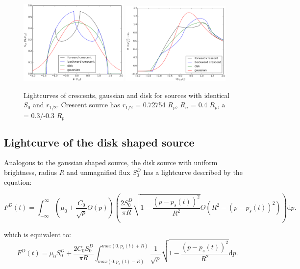 \begin{figure}
\centering
	\includegraphics[width = 0.48\textwidth]{plots/4source_profile.eps}
	\includegraphics[width = 0.48\textwidth]{plots/4source_magnification.eps}
\caption{\label{fig:lightcurve_gauss} Lightcurves of crescents, gaussian and disk for sources with identical $S_0$ and $r_{1/2}$. Crescent source has $r_{1/2}$ = 0.72754 $R_p$, $R_n$ = 0.4 $R_p$, a = 0.3/-0.3 $R_p$ }
\end{figure}


\subsection{Lightcurve of the disk shaped source}

Analogous to the gaussian shaped source, the disk source with uniform brightness, radius $R$ and unmagnified flux $S_0^D$ has a lightcurve described by the equation:

\begin{equation}
 F^D(t) = \int_{-\infty}^\infty  \left( \mu_0 + \frac{C_0}{\sqrt{p}} \Theta \left( p \right) \right) \left( \frac{2 S_0^D}{ \pi R} \sqrt{1 - \frac{\left( p-p_s(t) \right)^2}{R^2}} \Theta \left(R^2 - \left(p-p_s(t) \right)^2 \right) \right) \mathrm{d}p.
\end{equation}

which is equivalent to:
\begin{equation}
 F^D(t) = \mu_0 S_0^D + \frac{2 C_0 S_0^D}{\pi R} \int_{max(0, p_s(t) - R)}^{max(0, p_s(t) + R)} \frac{1}{\sqrt{p}} \sqrt{1 - \frac{\left( p-p_s(t) \right)^2}{R^2}} \mathrm{d}p.
\end{equation}

